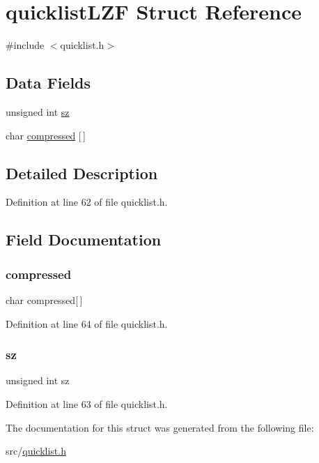 \hypertarget{structquicklist_l_z_f}{}\section{quicklist\+L\+ZF Struct Reference}
\label{structquicklist_l_z_f}


{\ttfamily \#include $<$quicklist.\+h$>$}

\subsection*{Data Fields}
\begin{DoxyCompactItemize}
\item 
unsigned int \hyperlink{structquicklist_l_z_f_a2c1bd10d4bbc82d2d6c052c5842c0c8c}{sz}
\item 
char \hyperlink{structquicklist_l_z_f_a80d845eaac2c3cf3966eb9c50a69fcf4}{compressed} \mbox{[}$\,$\mbox{]}
\end{DoxyCompactItemize}


\subsection{Detailed Description}


Definition at line 62 of file quicklist.\+h.



\subsection{Field Documentation}
\mbox{\label{structquicklist_l_z_f_a80d845eaac2c3cf3966eb9c50a69fcf4}} 
\subsubsection{\texorpdfstring{compressed}{compressed}}
{\footnotesize\ttfamily char compressed\mbox{[}$\,$\mbox{]}}



Definition at line 64 of file quicklist.\+h.

\mbox{\label{structquicklist_l_z_f_a2c1bd10d4bbc82d2d6c052c5842c0c8c}} 
\subsubsection{\texorpdfstring{sz}{sz}}
{\footnotesize\ttfamily unsigned int sz}



Definition at line 63 of file quicklist.\+h.



The documentation for this struct was generated from the following file\+:\begin{DoxyCompactItemize}
\item 
src/\hyperlink{quicklist_8h}{quicklist.\+h}\end{DoxyCompactItemize}
